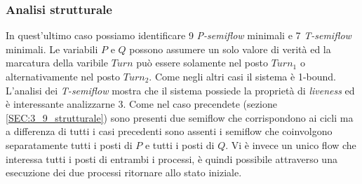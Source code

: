 \documentclass[a4paper]{article}
\begin{document}
\subsubsection{Analisi strutturale}
In quest'ultimo caso possiamo identificare 9 \textit{P-semiflow} minimali e 7 \textit{T-semiflow} minimali. 
Le variabili $P$ e $Q$ possono assumere un solo valore di verità ed la marcatura della varibile $Turn $ può essere solamente nel posto $Turn_1$ o alternativamente nel posto $Turn_2$. 
Come negli altri casi il sistema è 1-bound.\\
L'analisi dei \textit{T-semiflow} mostra che il sistema possiede la proprietà di \textit{liveness} ed è interessante analizzarne 3.
Come nel caso precendete (sezione \ref{SEC:3_9_strutturale}) sono presenti due semiflow che corrispondono ai cicli ma a differenza di tutti i casi precedenti sono assenti i semiflow che coinvolgono separatamente tutti i posti di $P$ e tutti i posti di $Q$.
Vi è invece un unico flow che interessa tutti i posti di entrambi i processi, è quindi possibile attraverso una esecuzione dei due processi ritornare allo stato iniziale.
\end{document}
